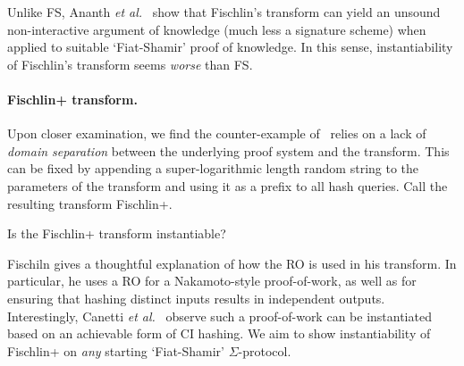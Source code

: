 Unlike FS, Ananth \emph{et al.}~\cite{TCC:ABGR13} show that Fischlin's transform can yield an unsound non-interactive argument of knowledge (much less a signature scheme) when applied to suitable `Fiat-Shamir' proof of knowledge. In this sense, instantiability of Fischlin's transform seems  \emph{worse} than FS. 

\paragraph*{Fischlin+ transform.} Upon closer examination, we find the counter-example of~\cite{TCC:ABGR13} relies on a lack of \emph{domain separation} between the underlying proof system and the transform. This can be  fixed by appending a super-logarithmic length random string to the parameters of the transform and using it as a prefix to all hash queries. 
Call the resulting transform Fischlin+.

\begin{ques}
    Is the Fischlin+ transform instantiable?
\end{ques}


Fischiln gives a thoughtful explanation  of how the RO is used in his transform.
In particular, he uses a RO for a Nakamoto-style proof-of-work, as well as for ensuring that hashing  distinct inputs results in  independent outputs.  Interestingly,  Canetti \emph{et al.}~\cite{EC:CCRR18} observe such a  proof-of-work can be instantiated based on an achievable form of  CI hashing.
We aim to show instantiability of Fischlin+ on \emph{any} starting `Fiat-Shamir' $\Sigma$-protocol.
\fi 



